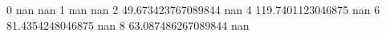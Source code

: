 0 nan nan
1 nan nan
2 49.673423767089844 nan
4 119.7401123046875 nan
6 81.4354248046875 nan
8 63.087486267089844 nan
